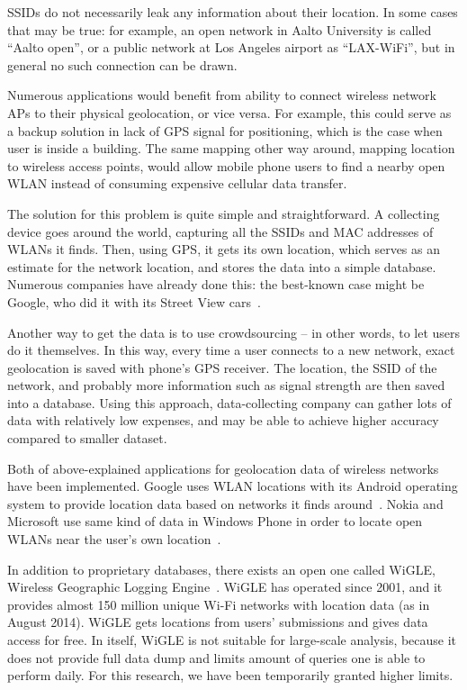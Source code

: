 \documentclass[12pt,a4paper,oneside,pdftex]{report}
\begin{document}
SSIDs do not necessarily leak any information about their location. In some cases that may be true: for example, an open network in Aalto University is called ``Aalto open'', or a public network at Los Angeles airport as ``LAX-WiFi'', but in general no such connection can be drawn.

Numerous applications would benefit from ability to connect wireless network APs to their physical geolocation, or vice versa. For example, this could serve as a backup solution in lack of GPS signal for positioning, which is the case when user is inside a building. The same mapping other way around, mapping location to wireless access points, would allow mobile phone users to find a nearby open WLAN instead of consuming expensive cellular data transfer.

The solution for this problem is quite simple and straightforward. A collecting device goes around the world, capturing all the SSIDs and MAC addresses of WLANs it finds. Then, using GPS, it gets its own location, which serves as an estimate for the network location, and stores the data into a simple database. Numerous companies have already done this: the best-known case might be Google, who did it with its Street View cars~\cite{google_wifi_collection}. 

Another way to get the data is to use crowdsourcing -- in other words, to let users do it themselves. In this way, every time a user connects to a new network, exact geolocation is saved with phone's GPS receiver. The location, the SSID of the network, and probably more information such as signal strength are then saved into a database. Using this approach, data-collecting company can gather lots of data with relatively low expenses, and may be able to achieve higher accuracy compared to smaller dataset.

Both of above-explained applications for geolocation data of wireless networks have been implemented. Google uses WLAN locations with its Android operating system to provide location data based on networks it finds around~\cite{google_wifi_collection}. Nokia and Microsoft use same kind of data in Windows Phone in order to locate open WLANs near the user's own location~\cite{nokia_datasense}.

In addition to proprietary databases, there exists an open one called WiGLE, Wireless Geographic Logging Engine~\cite{wigle}. WiGLE has operated since 2001, and it provides almost 150 million unique Wi-Fi networks with location data (as in August 2014). WiGLE gets locations from users' submissions and gives data access for free. In itself, WiGLE is not suitable for large-scale analysis, because it does not provide full data dump and limits amount of queries one is able to perform daily. For this research, we have been temporarily granted higher limits.
\end{document}
